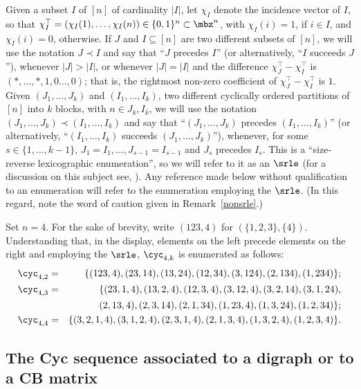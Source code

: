 \begin{remark}\label{srle}
Given a subset $I$ of $[n]$ of cardinality $\lvert I\rvert$, let
$\chi_I$ denote the incidence vector of $I$, so that
$\chi_I^{\top}=(\chi_{I}(1),\ldots ,\chi_{I}(n))\in \{0,1\}^n\subset
\mbz^n$, with $\chi_I(i)=1$, if $i\in I$, and $\chi_I(i)=0$,
otherwise.  If $J$ and $I\subseteq [n]$ are two different subsets of
$[n]$, we will use the notation $J\prec I$ and say that ``$J$ precedes
$I$'' (or alternatively, ``$I$ succeeds $J$''), whenever $\lvert
J\rvert >\lvert I\rvert$, or whenever $\lvert J\rvert=\lvert I\rvert$
and the difference $\chi_J^{\top}-\chi_I^{\top}$ is $(*,\ldots
,*,1,0\ldots ,0)$; that is, the rightmost non-zero coefficient of
$\chi_J^{\top}-\chi_I^{\top}$ is $1$.  Given $(J_1,\ldots ,J_k)$ and
$(I_1,\ldots ,I_k)$, two different cyclically ordered partitions of
$[n]$ into $k$ blocks, with $n\in J_k,I_k$, we will use the notation
$(J_1,\ldots ,J_k)\prec (I_1,\ldots ,I_k)$ and say that ``$(J_1,\ldots
,J_k)$ precedes $(I_1,\ldots ,I_k)$'' (or alternatively,
``$(I_1,\ldots ,I_k)$ succeeds $(J_1,\ldots ,J_k)$''), whenever, for
some $s\in\{1,\ldots ,k-1\}$, $J_1=I_1,\ldots ,J_{s-1}=I_{s-1}$ and
$J_{s}$ precedes $I_s$. This is a ``size-reverse lexicographic
enumeration'', so we will refer to it as an $\srle$ (for a discussion
on this subject see, \eg \cite{lhs}). Any reference made below
without qualification to an enumeration will refer to the enumeration
employing the $\srle$. (In this regard, note the word of caution
given in Remark~\ref{nonsrle}.)
\end{remark}

\begin{example}\label{srlen=4}
Set $n=4$. For the sake of brevity, write $(123,4)$ for
$(\{1,2,3\},\{4\})$.  Understanding that, in the display, elements on
the left precede elements on the right and employing the $\srle$,
$\cyc_{4,k}$ is enumerated as follows:
\begin{eqnarray*}
\cyc_{4,2}&=&\{(123,4),(23,14),(13,24),(12,34),(3,124),(2,134),(1,234)\};\\ 
\cyc_{4,3}&=&\{(23,1,4),(13,2,4),(12,3,4),(3,12,4),(3,2,14),(3,1,24),\\ 
&\mbox{ }&(2,13,4),(2,3,14),(2,1,34),(1,23,4),(1,3,24),(1,2,34)\};\\ 
\cyc_{4,4}&=&\{(3,2,1,4),(3,1,2,4),(2,3,1,4),(2,1,3,4),(1,3,2,4),
(1,2,3,4)\}.
\end{eqnarray*}
\end{example}

\subsection{The Cyc sequence associated to a digraph or to a CB matrix}

